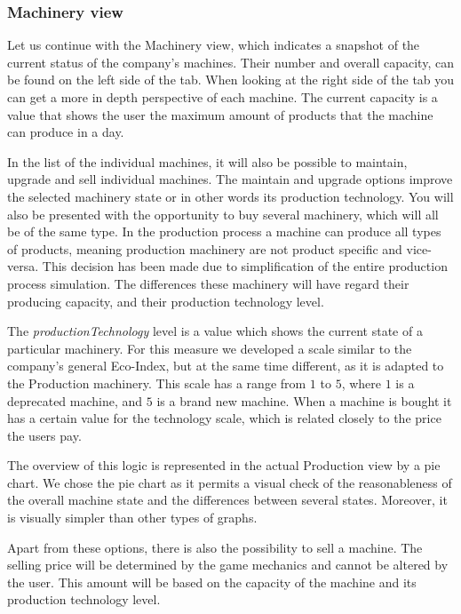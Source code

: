 \subsubsection{Machinery view} 
\label{sub:MachineryView}
Let us continue with the Machinery view, which indicates a snapshot of the current status of the company's machines. Their number and overall capacity, can be found on the left side of the tab. When looking at the right side of the tab you can get a more in depth perspective of each machine. The current capacity is a value that shows the user the maximum amount of products that the machine can produce in a day. 

 In the list of the individual machines, it will also be possible to maintain, upgrade and sell individual machines. The maintain and upgrade options improve the selected machinery state or in other words its production technology. 
You will also be presented with the opportunity to buy several machinery, which will all be of the same type. In the production process a machine can produce all types of products, meaning production machinery are not product specific and vice-versa. This decision has been made due to simplification of the entire production process simulation. The differences these machinery will have regard their producing capacity, and their production technology level. 

The \textit{productionTechnology} level is a value which shows the current state of a particular machinery. For this measure we developed a scale similar to the company’s general Eco-Index, but at the same time different, as it is adapted to the Production machinery.  This scale has a range from $1$ to $5$, where $1$ is a deprecated machine, and $5$ is a brand new machine. When a machine is bought it has a certain value for the technology scale, which is related closely to the price the users pay. 

The overview of this logic is represented in the actual Production view by a pie chart. We chose the pie chart as it permits a visual check of the reasonableness of the overall machine state and the differences between several states. Moreover, it is visually simpler than other types of graphs.
 
Apart from these options, there is also the possibility to sell a machine. The selling price will be determined by the game mechanics and cannot be altered by the user. This amount will be based on the capacity of the machine and its production technology level.

